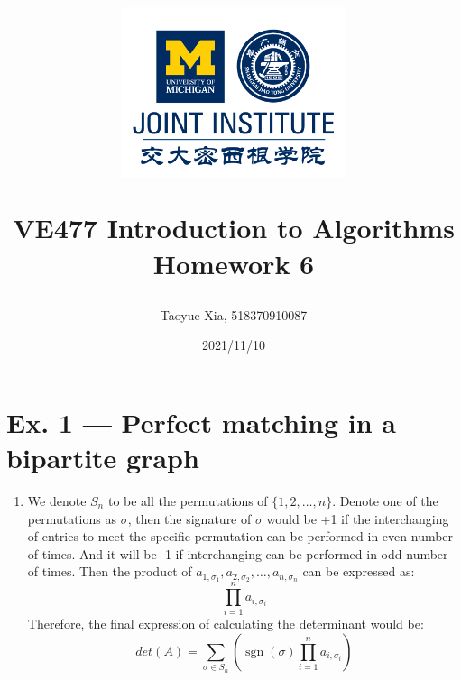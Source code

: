 \documentclass[12pt, a4paper]{article}
\title{
    \begin{figure}[H]
        \centering
        \includegraphics[width=7cm, height=5cm]{AAA.png}
    \end{figure}
    VE477 Introduction to Algorithms\\ 
    Homework 6}
\author{Taoyue Xia, 518370910087}
\date{2021/11/10}
\begin{document}
\maketitle

\newpage

\section*{Ex. 1 --- Perfect matching in a bipartite graph}
\begin{enumerate}
    \item We denote $S_n$ to be all the permutations of $\{1, 2, \dots, n\}$. Denote one of the permutations as $\sigma$, 
          then the signature of $\sigma$ would be +1 if the interchanging of entries to meet the specific permutation can be performed in even number of times. 
          And it will be -1 if interchanging can be performed in odd number of times.
          Then the product of $a_{1,\sigma_1}, a_{2,\sigma_2},\dots,a_{n,\sigma_n}$ can be expressed as:
          \[\prod_{i=1}^n a_{i, \sigma_i}\]
          Therefore, the final expression of calculating the determinant would be:
          \[det(A) = \sum_{\sigma \in S_n}(\operatorname{sgn}(\sigma) \prod_{i=1}^n a_{i, \sigma_i})\]


\end{enumerate}
\end{document}
